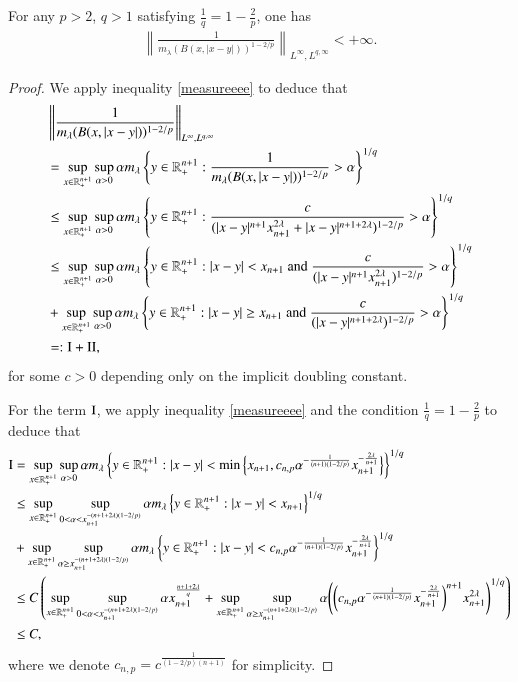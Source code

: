 \documentclass[12pt]{amsart}
\begin{document}
\begin{lemma}\label{disin}
For any $p>2$, $q>1$ satisfying $\frac{1}{q}=1-\frac{2}{p}$, one has
\begin{align}
\left\|\frac{1}{m_\lambda(B(x,|x-y|))^{1-2/p}}\right\|_{L^{\infty},L^{q,\infty}}<+\infty.
\end{align}
\end{lemma}
\begin{proof}
We apply inequality \eqref{measureeee} to deduce that
\begin{align*}
 &\left\|\frac{1}{m_\lambda(B(x,|x-y|))^{1-2/p}}\right\|_{L^{\infty},L^{q,\infty}}\\
 &=\sup\limits_{x\in\mathbb{R}_+^{n+1}}\sup\limits_{\alpha>0}\alpha m_\lambda\left\{y\in\mathbb{R}_+^{n+1}:\frac{1}{m_\lambda(B(x,|x-y|))^{1-2/p}}>\alpha\right\}^{1/q}\\
 &\leq \sup\limits_{x\in\mathbb{R}_+^{n+1}}\sup\limits_{\alpha>0}\alpha m_\lambda\left\{y\in\mathbb{R}_+^{n+1}:\frac{c}{(|x-y|^{n+1}x_{n+1}^{2\lambda}+|x-y|^{n+1+2\lambda})^{1-2/p}}>\alpha\right\}^{1/q}\\
 &\leq \sup\limits_{x\in\mathbb{R}_+^{n+1}}\sup\limits_{\alpha>0}\alpha m_\lambda\left\{y\in\mathbb{R}_+^{n+1}:|x-y|<x_{n+1}\ {\rm and}\ \frac{c}{(|x-y|^{n+1}x_{n+1}^{2\lambda})^{1-2/p}}>\alpha\right\}^{1/q}\\
 &+ \sup\limits_{x\in\mathbb{R}_+^{n+1}}\sup\limits_{\alpha>0}\alpha m_\lambda\left\{y\in\mathbb{R}_+^{n+1}:|x-y|\geq x_{n+1}\ {\rm and}\ \frac{c}{(|x-y|^{n+1+2\lambda})^{1-2/p}}>\alpha\right\}^{1/q}\\
 &=:{\rm I}+{\rm II},
 \end{align*}
 for some $c>0$ depending only on the implicit doubling constant.

For the term ${\rm I}$, we apply inequality \eqref{measureeee} and the condition $\frac{1}{q}=1-\frac{2}{p}$ to deduce that
\begin{align*}
{\rm I}&=\sup\limits_{x\in\mathbb{R}_+^{n+1}}\sup\limits_{\alpha>0}\alpha m_\lambda\left\{y\in\mathbb{R}_+^{n+1}:|x-y|<\min\Big\{x_{n+1},c_{n,p}\alpha^{-\frac{1}{(n+1)(1-2/p)}}x_{n+1}^{-\frac{2\lambda}{n+1}}\Big\}\right\}^{1/q}\\
&\leq \sup\limits_{x\in\mathbb{R}_+^{n+1}}\sup\limits_{0<\alpha<x_{n+1}^{-(n+1+2\lambda)(1-2/p)}}\alpha m_\lambda\left\{y\in\mathbb{R}_+^{n+1}:|x-y|<x_{n+1}\right\}^{1/q}\\
&+\sup\limits_{x\in\mathbb{R}_+^{n+1}}\sup\limits_{\alpha\geq x_{n+1}^{-(n+1+2\lambda)(1-2/p)}}\alpha m_\lambda\left\{y\in\mathbb{R}_+^{n+1}:|x-y|<c_{n,p}\alpha^{-\frac{1}{(n+1)(1-2/p)}}x_{n+1}^{-\frac{2\lambda}{n+1}}\right\}^{1/q}\\
&\leq C\left(\sup\limits_{x\in\mathbb{R}_+^{n+1}}\sup\limits_{0<\alpha<x_{n+1}^{-(n+1+2\lambda)(1-2/p)}}\alpha x_{n+1}^{\frac{n+1+2\lambda}{q}}+\sup\limits_{x\in\mathbb{R}_+^{n+1}}\sup\limits_{\alpha\geq x_{n+1}^{-(n+1+2\lambda)(1-2/p)}}\alpha \Bigg(\bigg(c_{n,p}\alpha^{-\frac{1}{(n+1)(1-2/p)}}x_{n+1}^{-\frac{2\lambda}{n+1}}\bigg)^{n+1}x_{n+1}^{2\lambda}\Bigg)^{1/q} \right)\\
&\leq C,
\end{align*}
where we denote $c_{n,p}=c^{\frac{1}{(1-2/p)(n+1)}}$ for simplicity.


\end{proof}
\end{document}
